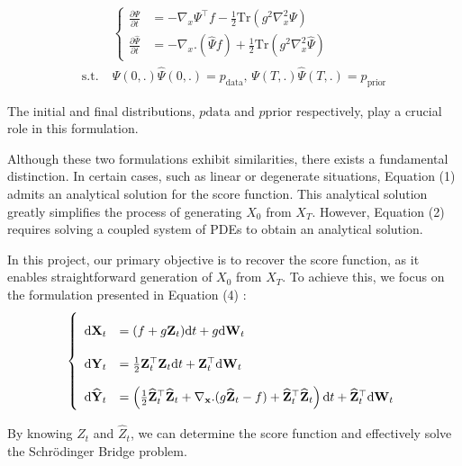 \documentclass{article}
\begin{document}
\begin{equation}\label{eq:SB-PDE}\tag{SB-PDE}
\begin{aligned}
&\left\{\begin{array}{cc}
  \frac{\partial\Psi}{\partial t}   & = -\nabla_x\Psi^\top f - \frac{1}{2}\mathrm{Tr}(g^2\nabla_x^2\Psi)  \\
     \frac{\partial\widehat{\Psi}}{\partial t} & = -\nabla_x.(\widehat{\Psi}f) + \frac{1}{2}\mathrm{Tr}(g^2\nabla_x^2\widehat{\Psi})
\end{array}\right. \\
\mathrm{s.t.}\; &\Psi(0,.)\widehat\Psi(0,.) = p_\mathrm{data}, \,\Psi(T,.)\widehat\Psi(T,.) = p_\mathrm{prior}
\end{aligned}
\end{equation}

The initial and final distributions, $p\mathrm{data}$ and $p\mathrm{prior}$ respectively, play a crucial role in this formulation.

Although these two formulations exhibit similarities, there exists a fundamental distinction. In certain cases, such as linear or degenerate situations, Equation (1) admits an analytical solution for the score function. This analytical solution greatly simplifies the process of generating $X_0$ from $X_T$. However, Equation (2) requires solving a coupled system of PDEs to obtain an analytical solution.

In this project, our primary objective is to recover the score function, as it enables straightforward generation of $X_0$ from $X_T$. To achieve this, we focus on the formulation presented in Equation (4) :
\begin{equation}\label{eq:newFBSDE}
\def\arraystretch{2.2}
\left\{\begin{array}{ll}
  \dint\mathbf{X}_t & = (f+g\mathbf{Z}_t) \dint t + g \dint \mathbf{W}_t  \\
  \dint\mathbf{Y}_t & = \frac{1}{2}\mathbf{Z}_t^\top\mathbf{Z}_t\dint t + \mathbf{Z}_t^\top\dint\mathbf{W}_t \\
  \dint\widehat{\mathbf{Y}}_t & = \pars{\frac{1}{2}\widehat{\mathbf{Z}}_t^\top\widehat{\mathbf{Z}}_t + \nabla_\mathbf{x} . (g\widehat{\mathbf{Z}}_t - f) + \widehat{\mathbf{Z}}_t^\top\widehat{\mathbf{Z}}_t} \dint t + \widehat{\mathbf{Z}}_t^\top\dint\mathbf{W}_t
\end{array}\right.
\end{equation}

By knowing $Z_t$ and $\hat{Z}_t$, we can determine the score function and effectively solve the Schrödinger Bridge problem.
\end{document}
